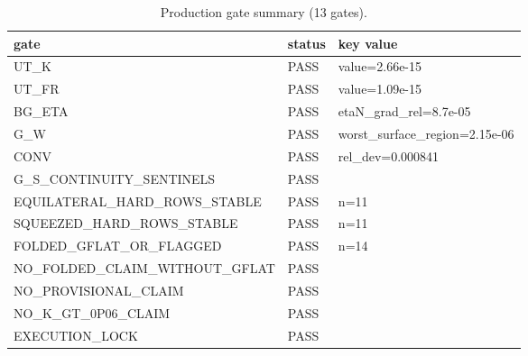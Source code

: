 \begin{table}[htbp]
\centering
\caption{Production gate summary (13 gates).}
\label{tab:gates}
\begin{tabular}{lll}
\hline
gate & status & key value \\
\hline
UT\_K & PASS & value=2.66e-15 \\
UT\_FR & PASS & value=1.09e-15 \\
BG\_ETA & PASS & etaN\_grad\_rel=8.7e-05 \\
G\_W & PASS & worst\_surface\_region=2.15e-06 \\
CONV & PASS & rel\_dev=0.000841 \\
G\_S\_CONTINUITY\_SENTINELS & PASS &  \\
EQUILATERAL\_HARD\_ROWS\_STABLE & PASS & n=11 \\
SQUEEZED\_HARD\_ROWS\_STABLE & PASS & n=11 \\
FOLDED\_GFLAT\_OR\_FLAGGED & PASS & n=14 \\
NO\_FOLDED\_CLAIM\_WITHOUT\_GFLAT & PASS &  \\
NO\_PROVISIONAL\_CLAIM & PASS &  \\
NO\_K\_GT\_0P06\_CLAIM & PASS &  \\
EXECUTION\_LOCK & PASS &  \\
\hline
\end{tabular}
\end{table}
